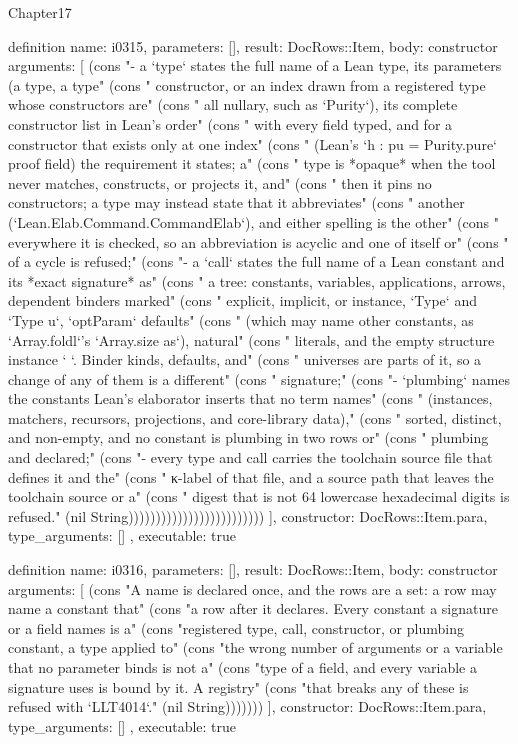 \begin{lexlean}{Chapter17}
\begin{semanticmodule}
definition{
  name: i0315,
  parameters: [],
  result: DocRows::Item,
  body: constructor{
    arguments: [
      (cons "- a `type` states the full name of a Lean type, its parameters (a type, a type" (cons "  constructor, or an index drawn from a registered type whose constructors are" (cons "  all nullary, such as `Purity`), its complete constructor list in Lean's order" (cons "  with every field typed, and for a constructor that exists only at one index" (cons "  (Lean's `h : pu = Purity.pure` proof field) the requirement it states; a" (cons "  type is *opaque* when the tool never matches, constructs, or projects it, and" (cons "  then it pins no constructors; a type may instead state that it abbreviates" (cons "  another (`Lean.Elab.Command.CommandElab`), and either spelling is the other" (cons "  everywhere it is checked, so an abbreviation is acyclic and one of itself or" (cons "  of a cycle is refused;" (cons "- a `call` states the full name of a Lean constant and its *exact signature* as" (cons "  a tree: constants, variables, applications, arrows, dependent binders marked" (cons "  explicit, implicit, or instance, `Type` and `Type u`, `optParam` defaults" (cons "  (which may name other constants, as `Array.foldl`'s `Array.size as`), natural" (cons "  literals, and the empty structure instance `{ }`. Binder kinds, defaults, and" (cons "  universes are parts of it, so a change of any of them is a different" (cons "  signature;" (cons "- `plumbing` names the constants Lean's elaborator inserts that no term names" (cons "  (instances, matchers, recursors, projections, and core-library data)," (cons "  sorted, distinct, and non-empty, and no constant is plumbing in two rows or" (cons "  plumbing and declared;" (cons "- every type and call carries the toolchain source file that defines it and the" (cons "  κ-label of that file, and a source path that leaves the toolchain source or a" (cons "  digest that is not 64 lowercase hexadecimal digits is refused." (nil String)))))))))))))))))))))))))
    ],
    constructor: DocRows::Item.para,
    type_arguments: []
  },
  executable: true
}

definition{
  name: i0316,
  parameters: [],
  result: DocRows::Item,
  body: constructor{
    arguments: [
      (cons "A name is declared once, and the rows are a set: a row may name a constant that" (cons "a row after it declares. Every constant a signature or a field names is a" (cons "registered type, call, constructor, or plumbing constant, a type applied to" (cons "the wrong number of arguments or a variable that no parameter binds is not a" (cons "type of a field, and every variable a signature uses is bound by it. A registry" (cons "that breaks any of these is refused with `LLT4014`." (nil String)))))))
    ],
    constructor: DocRows::Item.para,
    type_arguments: []
  },
  executable: true
}


\end{semanticmodule}
\end{lexlean}
